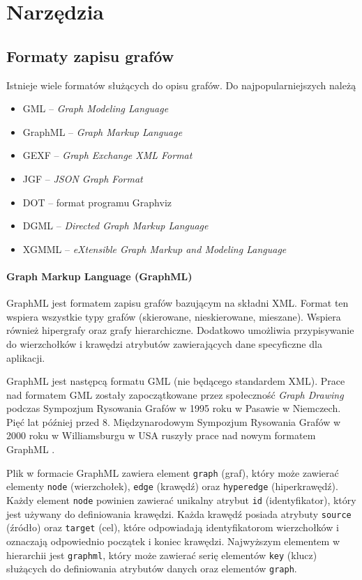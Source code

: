 \chapter{Narzędzia}
\section{Formaty zapisu grafów} \label{sec:graph-formats}
Istnieje wiele formatów służących do opisu grafów. Do najpopularniejszych należą \cite{bernard,gephi}

\begin{itemize}
\setlength\itemsep{0em}
\item GML -- \textit{Graph Modeling Language }
\item GraphML -- \textit{Graph Markup Language}
\item GEXF -- \textit{Graph Exchange XML Format}
\item JGF -- \textit{JSON Graph Format}
\item DOT -- format programu Graphviz
\item DGML -- \textit{Directed Graph Markup Language}
\item XGMML -- \textit{eXtensible Graph Markup and Modeling Language}
\end{itemize}

\subsubsection{Graph Markup Language (GraphML)}

GraphML jest formatem zapisu grafów bazującym na składni XML. Format ten wspiera wszystkie typy grafów (skierowane, nieskierowane, mieszane). Wspiera również hipergrafy oraz grafy hierarchiczne. Dodatkowo umożliwia przypisywanie do wierzchołków i krawędzi atrybutów zawierających dane specyficzne dla aplikacji. 

GraphML jest następcą formatu GML (nie będącego standardem XML). Prace nad formatem GML zostały zapoczątkowane przez społeczność \textit{Graph Drawing} podczas Sympozjum Rysowania Grafów w 1995 roku w Pasawie w Niemczech. Pięć lat później przed 8. Międzynarodowym Sympozjum Rysowania Grafów w 2000 roku w Williamsburgu w USA ruszyły prace nad nowym formatem GraphML \cite{graphml}.

Plik w formacie GraphML zawiera element \texttt{graph} (graf), który może zawierać elementy \texttt{node} (wierzchołek), \texttt{edge} (krawędź) oraz \texttt{hyperedge} (hiperkrawędź). Każdy element \texttt{node} powinien zawierać unikalny atrybut \texttt{id} (identyfikator), który jest używany do definiowania krawędzi. Każda krawędź posiada atrybuty \texttt{source} (źródło) oraz \texttt{target} (cel), które odpowiadają identyfikatorom wierzchołków i oznaczają odpowiednio początek i koniec krawędzi. Najwyższym elementem w hierarchii jest \texttt{graphml}, który może zawierać serię elementów \texttt{key} (klucz) służących do definiowania atrybutów danych oraz elementów \texttt{graph}.

